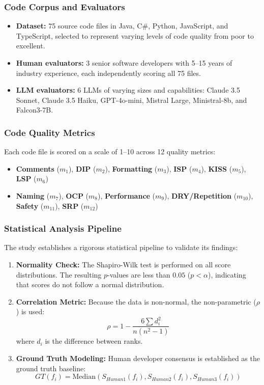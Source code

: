 \subsubsection{Code Corpus and Evaluators}
\begin{itemize}
    \item \textbf{Dataset:} 75 source code files in Java, C\#, Python, JavaScript, and TypeScript, selected to represent varying levels of code quality from poor to excellent.
    \item \textbf{Human evaluators:} 3 senior software developers with 5--15 years of industry experience, each independently scoring all 75 files.
    \item \textbf{LLM evaluators:} 6 LLMs of varying sizes and capabilities: Claude 3.5 Sonnet, Claude 3.5 Haiku, GPT-4o-mini, Mistral Large, Ministral-8b, and Falcon3-7B.
\end{itemize}

\subsubsection{Code Quality Metrics}
Each code file is scored on a scale of 1--10 across 12 quality metrics:
\begin{itemize}
    \item \textbf{Comments} ($m_1$), \textbf{DIP} ($m_2$), \textbf{Formatting} ($m_3$), \textbf{ISP} ($m_4$), \textbf{KISS} ($m_5$), \textbf{LSP} ($m_6$)
    \item \textbf{Naming} ($m_7$), \textbf{OCP} ($m_8$), \textbf{Performance} ($m_9$), \textbf{DRY/Repetition} ($m_{10}$), \textbf{Safety} ($m_{11}$), \textbf{SRP} ($m_{12}$)
\end{itemize}

\subsubsection{Statistical Analysis Pipeline}
The study establishes a rigorous statistical pipeline to validate its findings:
\begin{enumerate}
    \item \textbf{Normality Check:} The Shapiro-Wilk test is performed on all score distributions. The resulting $p$-values are less than $0.05$ ($p < \alpha$), indicating that scores do not follow a normal distribution.
    \item \textbf{Correlation Metric:} Because the data is non-normal, the non-parametric  ($\rho$) is used:
    \begin{equation}
        \rho = 1 - \frac{6 \sum d_i^2}{n(n^2 - 1)}
    \end{equation}
    where $d_i$ is the difference between ranks.
    \item \textbf{Ground Truth Modeling:} Human developer consensus is established as the ground truth baseline:
    \begin{equation}
        GT(f_i) = \text{Median}(S_{Human1}(f_i), S_{Human2}(f_i), S_{Human3}(f_i))
    \end{equation}
\end{enumerate}

